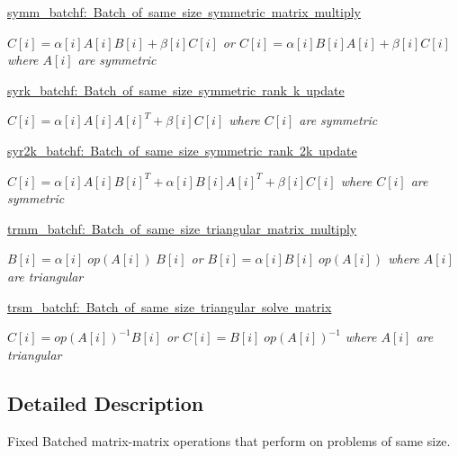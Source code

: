 \begin{DoxyCompactItemize}
\mbox{\hyperlink{group__symm__batchf}{symm\+\_\+batchf\+:  Batch of same size symmetric matrix multiply}}
\begin{DoxyCompactList}\small\item\em $ C[i] = \alpha[i] A[i] B[i] + \beta[i] C[i] $ or $ C[i] = \alpha[i] B[i] A[i] + \beta[i] C[i] $ where $ A[i] $ are symmetric \end{DoxyCompactList}\item 
\mbox{\hyperlink{group__syrk__batchf}{syrk\+\_\+batchf\+: Batch of same size symmetric rank k update}}
\begin{DoxyCompactList}\small\item\em $ C[i] = \alpha[i] A[i] A[i]^T + \beta[i] C[i] $ where $ C[i] $ are symmetric \end{DoxyCompactList}\item 
\mbox{\hyperlink{group__syr2k__batchf}{syr2k\+\_\+batchf\+: Batch of same size symmetric rank 2k update}}
\begin{DoxyCompactList}\small\item\em $ C[i] = \alpha[i] A[i] B[i]^T + \alpha[i] B[i] A[i]^T + \beta[i] C[i] $ where $ C[i] $ are symmetric \end{DoxyCompactList}\item 
\mbox{\hyperlink{group__trmm__batchf}{trmm\+\_\+batchf\+: Batch of same size triangular matrix multiply}}
\begin{DoxyCompactList}\small\item\em $ B[i] = \alpha[i] \;op(A[i])\; B[i] $ or $ B[i] = \alpha[i] B[i] \;op(A[i]) $ where $ A[i] $ are triangular \end{DoxyCompactList}\item 
\mbox{\hyperlink{group__trsm__batchf}{trsm\+\_\+batchf\+: Batch of same size triangular solve matrix}}
\begin{DoxyCompactList}\small\item\em $ C[i] = op(A[i])^{-1} B[i] $ or $ C[i] = B[i] \;op(A[i])^{-1} $ where $ A[i] $ are triangular \end{DoxyCompactList}\end{DoxyCompactItemize}


\subsection{Detailed Description}
Fixed Batched matrix-\/matrix operations that perform on problems of same size. 

